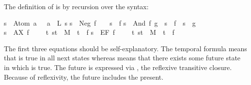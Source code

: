 \begin{isabellebody}
\begin{isamarkuptext}
\smallskip
The definition of \isa{{\isasymTurnstile}} is by recursion over the syntax:%
\end{isamarkuptext}%
\isanewline
{\isachardoublequote}s\ {\isasymTurnstile}\ Atom\ a\ \ {\isacharequal}\ {\isacharparenleft}a\ {\isasymin}\ L\ s{\isacharparenright}{\isachardoublequote}\isanewline
{\isachardoublequote}s\ {\isasymTurnstile}\ Neg\ f\ \ \ {\isacharequal}\ {\isacharparenleft}{\isasymnot}{\isacharparenleft}s\ {\isasymTurnstile}\ f{\isacharparenright}{\isacharparenright}{\isachardoublequote}\isanewline
{\isachardoublequote}s\ {\isasymTurnstile}\ And\ f\ g\ {\isacharequal}\ {\isacharparenleft}s\ {\isasymTurnstile}\ f\ {\isasymand}\ s\ {\isasymTurnstile}\ g{\isacharparenright}{\isachardoublequote}\isanewline
{\isachardoublequote}s\ {\isasymTurnstile}\ AX\ f\ \ \ \ {\isacharequal}\ {\isacharparenleft}{\isasymforall}t{\isachardot}\ {\isacharparenleft}s{\isacharcomma}t{\isacharparenright}\ {\isasymin}\ M\ {\isasymlongrightarrow}\ t\ {\isasymTurnstile}\ f{\isacharparenright}{\isachardoublequote}\isanewline
{\isachardoublequote}s\ {\isasymTurnstile}\ EF\ f\ \ \ \ {\isacharequal}\ {\isacharparenleft}{\isasymexists}t{\isachardot}\ {\isacharparenleft}s{\isacharcomma}t{\isacharparenright}\ {\isasymin}\ M\isactrlsup {\isacharasterisk}\ {\isasymand}\ t\ {\isasymTurnstile}\ f{\isacharparenright}{\isachardoublequote}%
\begin{isamarkuptext}%
\noindent
The first three equations should be self-explanatory. The temporal formula
 means that  is true in all next states whereas
 means that there exists some future state in which  is
true. The future is expressed via \isa{\isactrlsup {\isacharasterisk}}, the reflexive transitive
closure. Because of reflexivity, the future includes the present.


\end{isamarkuptext}
\end{isabellebody}
